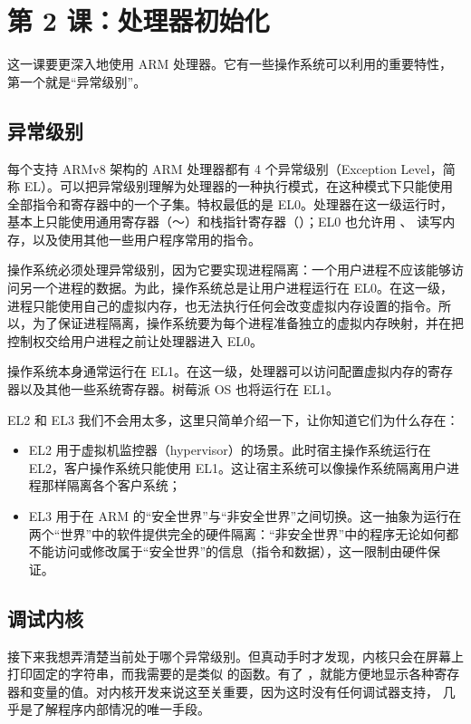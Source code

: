 \section{第 2 课：处理器初始化}
\label{sec:rpios-l2}

这一课要更深入地使用 ARM 处理器。它有一些操作系统可以利用的重要特性，第一个就是“异常级别”。

\subsection{异常级别}

每个支持 ARMv8 架构的 ARM 处理器都有 4 个异常级别（Exception Level，简称 EL）。可以把异常级别理解为处理器的一种执行模式，在这种模式下只能使用全部指令和寄存器中的一个子集。特权最低的是 EL0。处理器在这一级运行时，基本上只能使用通用寄存器（～）和栈指针寄存器（）；EL0 也允许用 、 读写内存，以及使用其他一些用户程序常用的指令。

操作系统必须处理异常级别，因为它要实现进程隔离：一个用户进程不应该能够访问另一个进程的数据。为此，操作系统总是让用户进程运行在 EL0。在这一级，进程只能使用自己的虚拟内存，也无法执行任何会改变虚拟内存设置的指令。所以，为了保证进程隔离，操作系统要为每个进程准备独立的虚拟内存映射，并在把控制权交给用户进程之前让处理器进入 EL0。

操作系统本身通常运行在 EL1。在这一级，处理器可以访问配置虚拟内存的寄存器以及其他一些系统寄存器。树莓派 OS 也将运行在 EL1。

EL2 和 EL3 我们不会用太多，这里只简单介绍一下，让你知道它们为什么存在：

\begin{itemize}
  \item EL2 用于虚拟机监控器（hypervisor）的场景。此时宿主操作系统运行在 EL2，客户操作系统只能使用 EL1。这让宿主系统可以像操作系统隔离用户进程那样隔离各个客户系统；
  \item EL3 用于在 ARM 的“安全世界”与“非安全世界”之间切换。这一抽象为运行在两个“世界”中的软件提供完全的硬件隔离：“非安全世界”中的程序无论如何都不能访问或修改属于“安全世界”的信息（指令和数据），这一限制由硬件保证。
\end{itemize}

\subsection{调试内核}

接下来我想弄清楚当前处于哪个异常级别。但真动手时才发现，内核只会在屏幕上打印固定的字符串，而我需要的是类似  的函数。有了 ，就能方便地显示各种寄存器和变量的值。对内核开发来说这至关重要，因为这时没有任何调试器支持， 几乎是了解程序内部情况的唯一手段。

